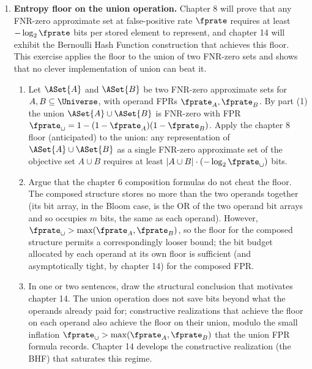 \begin{enumerate}
\item \exstarstarstar
\label{ex:ch6-11}
\textbf{Entropy floor on the union operation.}
Chapter 8 will prove that any FNR-zero approximate set at false-positive
rate $\fprate$ requires at least $-\log_2 \fprate$ bits per stored
element to represent, and chapter 14 will exhibit the Bernoulli Hash
Function construction that achieves this floor. This exercise applies
the floor to the union of two FNR-zero sets and shows that no clever
implementation of union can beat it.
\begin{enumerate}
  \item[(a)] Let $\ASet{A}$ and $\ASet{B}$ be two FNR-zero approximate
    sets for $A, B \subseteq \Universe$, with operand FPRs
    $\fprate_A, \fprate_B$. By  part (1)
    the union $\ASet{A} \cup \ASet{B}$ is FNR-zero with FPR
    $\fprate_{\cup} = 1 - (1 - \fprate_A)(1 - \fprate_B)$. Apply the
    chapter 8 floor (anticipated) to the union: any representation
    of $\ASet{A} \cup \ASet{B}$ as a single FNR-zero approximate set
    of the objective set $A \cup B$ requires at least $|A \cup B|
    \cdot (-\log_2 \fprate_{\cup})$ bits.
  \item[(b)] Argue that the chapter 6 composition formulas do not
    cheat the floor. The composed structure stores no more than the
    two operands together (its bit array, in the Bloom case, is the
    OR of the two operand bit arrays and so occupies $m$ bits, the
    same as each operand). However, $\fprate_{\cup} > \max(\fprate_A,
    \fprate_B)$, so the floor for the composed structure permits a
    correspondingly looser bound; the bit budget allocated by each
    operand at its own floor is sufficient (and asymptotically tight,
    by chapter 14) for the composed FPR.
  \item[(c)] In one or two sentences, draw the structural conclusion
    that motivates chapter 14. The union operation does not save
    bits beyond what the operands already paid for; constructive
    realizations that achieve the floor on each operand also achieve
    the floor on their union, modulo the small inflation $\fprate_{\cup}
    > \max(\fprate_A, \fprate_B)$ that the union FPR formula records.
    Chapter 14 develops the constructive realization (the BHF) that
    saturates this regime.
\end{enumerate}

\end{enumerate}
